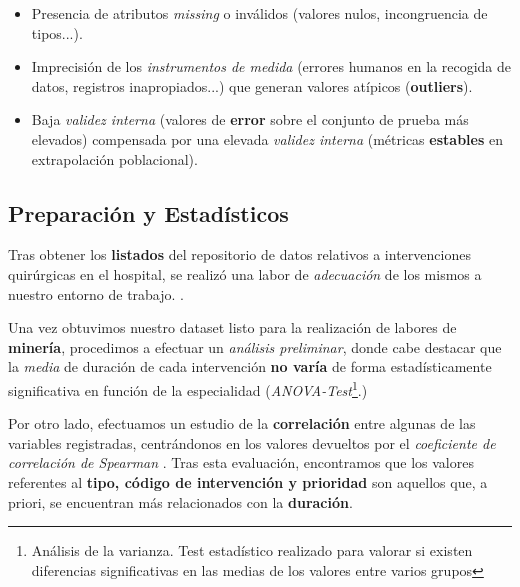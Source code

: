 \begin{itemize}
    \item Presencia de atributos \textit{missing} o inválidos (valores nulos, incongruencia de tipos...).
    \item Imprecisión de los \textit{instrumentos de medida} (errores humanos en la recogida de datos, registros inapropiados...) que generan valores atípicos (\textbf{outliers}).
    \item Baja \textit{validez interna} (valores de \textbf{error} sobre el conjunto de prueba más elevados) compensada por una elevada \textit{validez interna} (métricas \textbf{estables} en extrapolación poblacional).
\end{itemize}


 \subsection{Preparación y Estadísticos}

 Tras obtener los \textbf{listados} del repositorio de datos relativos a intervenciones quirúrgicas en el hospital, se realizó una labor de \textit{adecuación} de los mismos a nuestro entorno de trabajo. \cite{McKinney2010DataPython}.



 Una vez obtuvimos nuestro dataset listo para la realización de labores de \textbf{minería}, procedimos a efectuar un \textit{análisis preliminar}, donde cabe destacar que la \textit{media} de duración de cada intervención \textbf{no varía} de forma estadísticamente significativa en función de la especialidad (\textit{ANOVA-Test}\footnote{Análisis de la varianza. Test estadístico realizado para valorar si existen diferencias significativas en las medias de los valores entre varios grupos}.)


 Por otro lado, efectuamos un estudio de la \textbf{correlación} entre algunas de las variables registradas, centrándonos en los valores devueltos por el \textit{coeficiente de correlación de Spearman} \cite{Page1963OrderedRanks}. 
 Tras esta evaluación, encontramos que los valores referentes al \textbf{tipo, código de intervención y prioridad} son aquellos que, a priori, se encuentran más relacionados con la \textbf{duración}.


